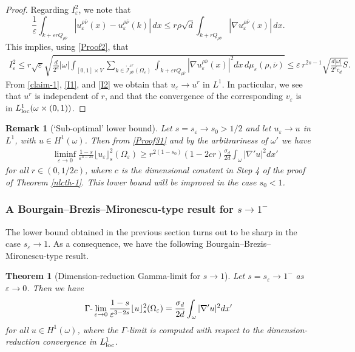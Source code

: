 \documentclass[11pt]{article}
\newtheorem{theorem}[definition]{Theorem}
\newtheorem{remark}[definition]{Remark}
\def\e{\varepsilon}
\begin{document}
\begin{proof}
Regarding $I^2_\e$, we note that
$$
\frac1\e\int_{k+{\e r}Q_{\rho\overline{\nu}}} |u^{\rho\overline{\nu}}_\e(x) - u_\e^{\rho\overline{\nu}}(k)|\,dx\le r\rho \sqrt d\int_{k+rQ_{\rho\overline{\nu}}} |\nabla u^{\rho\overline{\nu}}_\e(x)|\,dx.
$$
This implies, using \eqref{Proof2}, that
\begin{eqnarray}\label{I2}
I^2_\e\le  r\sqrt\e \sqrt{\frac{d}{2^{d}}|\omega|\int_{[0,1]\times V} \sum_{k \in {\mathring{\mathcal I}}^{\e r}_{\rho\overline{\nu}}(\Omega_\e)}\int_{k+\e r Q_{\rho\overline{\nu}}} |\nabla u_\e^{\rho\overline{\nu}}(x)|^2 dx\, d\mu_\e(\rho,\overline{\nu}) }
\le\e\,   r^{2s-1} \sqrt{\frac{d|\omega|}{2^d{c_d}}S}.
\end{eqnarray}
From \eqref{claim-1}, \eqref{I1}, and \eqref{I2} we obtain that $u_\e\to u^ r$ in $L^1$. In particular, we see that $u^r$ is independent of $ r$, and that the convergence of the corresponding $v_\e$ is in $L^1_{\rm loc}(\omega\times(0,1))$.
\end{proof}

\begin{remark}[`Sub-optimal' lower bound]\label{sub-rem}
\rm  Let $s=s_\e\to s_0>1/2$ and let $u_\e\to u$ in $L^1$, with $u\in H^1(\omega)$. Then from \eqref{Proof31} and by the arbitrariness of $\omega'$ we have
\begin{eqnarray}\label{Proof7}
&&\liminf_{\e\to 0}\frac{1-s}{\e^{3-2s}}\lfloor u_\e\rfloor_s^2(\Omega_\e)
\ge r^{2(1-s_0)}(1-2cr)\frac{\sigma_{d}}{2d}\int_{\omega}|\nabla' u|^2dx'
\end{eqnarray}
for all $r\in(0,1/2c)$, where $c$ is the dimensional constant in Step 4 of the proof of Theorem \ref{nlcth-1}. This lower bound will be improved in the case $s_0<1$.
\end{remark}

\subsubsection{A Bourgain--Brezis--Mironescu-type result for $s\to 1^-$ }\label{BBM1}
The lower bound obtained in the previous section turns out to be sharp in the case $s_\e\to 1$.
As a consequence, we have the following Bourgain--Brezis--Mironescu-type result.

\begin{theorem}[Dimension-reduction Gamma-limit for $s\to 1$]\label{Gammath} Let $s=s_\e\to 1^-$ as $\e\to 0$. 
Then we have
$$
\Gamma\hbox{-}\lim_{\e\to 0} \frac{1-s}{\e^{3-2s}}\lfloor u\rfloor_s^2(\Omega_\e)= \frac{\sigma_{d}}{2d}\int_\omega |\nabla'u|^2dx'
$$
for all $u\in H^1(\omega)$, where the $\Gamma$-limit is computed with respect to the dimension-reduction convergence in $L^1_{\rm loc}$.
\end{theorem}
\end{document}
